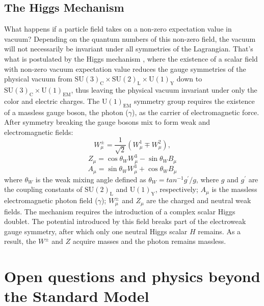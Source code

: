 \subsection{The Higgs Mechanism}

What happens if a particle field takes on a non-zero expectation value in vacuum? Depending on the
quantum numbers of this non-zero field, the vacuum will not necessarily be invariant under
all symmetries of the Lagrangian. That's what is postulated by the Higgs mechanism
\cite{Anderson:1963pc,Englert:1964et,Higgs:1964pj}, where
the existence of a scalar field with non-zero vacuum expectation value
reduces the gauge symmetries of the physical 
vacuum from $\text{SU}(3)_\text{C} \times \text{SU}(2)_\text{L} \times \text{U}(1)_\text{Y}$
down to $\text{SU}(3)_\text{C} \times \text{U}(1)_\text{EM}$, thus leaving the physical vacuum invariant under
only the color and electric charges. 
The $\text{U}(1)_\text{EM}$ symmetry group requires the existence of a massless
gauge boson, the photon ($\gamma$), as the carrier of electromagnetic force.
After symmetry breaking the gauge bosons mix to form weak and electromagnetic fields:
\begin{equation}
W_{\mu}^{\pm}=\frac{1}{\sqrt{2}}\left( W_{\mu}^1 \mp W_{\mu}^{2}\right),
\end{equation}
\begin{equation}
Z_{\mu}=\cos\theta_W W_{\mu}^3-\sin\theta_W B_{\mu}
\end{equation}
\begin{equation}
A_{\mu}=\sin\theta_W W_{\mu}^3+\cos\theta_W B_{\mu}
\end{equation}
where $\theta_W$ is the weak mixing angle defined as $\theta_W=tan^{-1} g^{'}/g$, where $g$ 
and $g^{'}$ are the coupling constants of $\text{SU}(2)_\text{L}$ and $\text{U}(1)_\text{Y}$, respectively; $A_{\mu}$ is the 
massless electromagnetic photon field ($\gamma$); $W_{\mu}^{\pm}$ and $Z_{\mu}$ are the charged 
and neutral weak fields. The mechanism requires the introduction of a complex
scalar Higgs doublet. The potential introduced by this field breaks part of the electroweak
 gauge symmetry,
after which only one neutral Higgs scalar $H$ remains. As a result, 
the $W^{\pm}$ and $Z$ acquire masses and the photon remains massless.

\section{Open questions and physics beyond the Standard Model}

